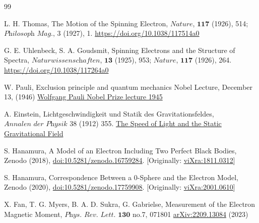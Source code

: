 \documentclass[%
 reprint,
 amsmath,amssymb,
 aps,
]{revtex4-1}
\numberwithin{equation}{section}%
\begin{document}
\begin{thebibliography}{99}

     L. H. Thomas, The Motion of the Spinning Electron, $\textit{Nature}$, $\textbf{117}$ (1926), 514; $\textit{Philosoph Mag.,}$ 3 (1927), 1. \href{https://www.nature.com/articles/117514a0}{https://doi.org/10.1038/117514a0}
    
     G. E. Uhlenbeck, S. A. Goudsmit, Spinning Electrons and the Structure of Spectra, $\textit{Naturwissenschaften}$, $\textbf{13}$ (1925), 953; $\textit{Nature}$, $\textbf{117}$ (1926), 264. \href{http://www.ffn.ub.es/luisnavarro/nuevo_maletin/Uhlenbeck_Goudsmit_1927.pdf}{https://doi.org/10.1038/117264a0}

     W. Pauli, Exclusion principle and quantum mechanics Nobel Lecture, December 13, (1946) \href{https://www.nobelprize.org/uploads/2018/06/pauli-lecture.pdf}{Wolfgang Pauli Nobel Prize lecture 1945}

     A. Einstein, Lichtgeschwindigkeit und Statik des Gravitationsfeldes, $\textit{Annalen der Physik}$ 38 (1912) 355. \href{http://myweb.rz.uni-augsburg.de/~eckern/adp/history/einstein-papers/1912_38_355-369.pdf}{The Speed of Light and the Static Gravitational Field}

     S. Hanamura, A Model of an Electron Including Two Perfect Black Bodies, Zenodo (2018), \href{https://doi.org/10.5281/zenodo.16759284}{doi:10.5281/zenodo.16759284}. [Originally: \href{http://vixra.org/abs/1811.0312}{viXra:1811.0312}]

     S. Hanamura, Correspondence Between a 0-Sphere and the Electron Model, Zenodo (2020), \href{https://doi.org/10.5281/zenodo.17759908}{doi:10.5281/zenodo.17759908}. [Originally: \href{https://vixra.org/abs/2001.0610}{viXra:2001.0610}]

     X. Fan, T. G. Myers, B. A. D. Sukra, G. Gabrielse, Measurement of the Electron Magnetic Moment, $\textit{Phys. Rev. Lett.}$ $\textbf{130}$ no.7, 071801 \href{https://arxiv.org/abs/2209.13084}{arXiv:2209.13084} (2023)



\end{thebibliography}
\end{document}
